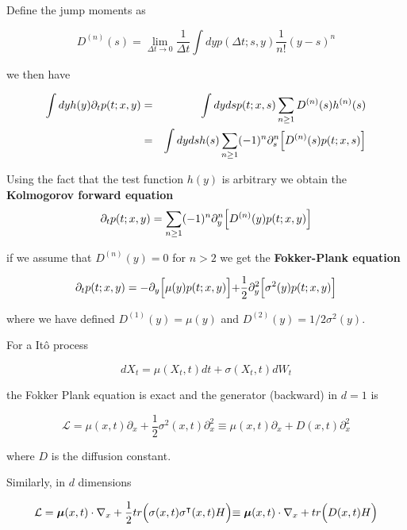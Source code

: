 \documentclass[11pt,a4paper]{article}
\begin{document}
Define the jump moments as 

\begin{equation}
    D^{(n)}(s) = \lim_{\Delta t \to 0}\frac{1}{\Delta t}\int dyp(\Delta t;s,y)\frac{1}{n!}(y-s)^n    
\end{equation}

we then have

\begin{eqnarray*}
    \int dyh(y)\partial_t p(t;x,y) &=&  \int dyds p(t;x,s)\sum_{n\geq 1}D^{(n)}(s)h^{(n)}(s)   \\
    &=& \int dyds h(s)\sum_{n\geq 1}(-1)^n\partial^{n}_{s}\Bigl[D^{(n)}(s)p(t;x,s)\Bigl]
\end{eqnarray*}


Using the fact that the test function $h(y)$ is arbitrary we obtain the \textbf{Kolmogorov forward equation}
\begin{equation}
\partial_t p(t;x,y) =  \sum_{n\geq 1}(-1)^n\partial^{n}_{y}   \Bigl[D^{(n)}(y)p(t;x,y)\Bigl]
\end{equation}

if we assume that $D^{(n)}(y)=0$ for $n>2$ we get the \textbf{Fokker-Plank equation}

\begin{equation}
    \partial_t p(t;x,y) =  -\partial_y\Bigl[\mu(y)p(t;x,y)\Bigl]  + \frac{1}{2}\partial^2_y \Bigl[\sigma^2(y)p(t;x,y)\Bigl]
\end{equation}

where we have defined $D^{(1)}(y) = \mu(y)$ and $D^{(2)}(y) = 1/2 \sigma^2(y)$.

For a It\^{o} process 

\begin{equation*}
    dX_t = \mu(X_t,t) dt + \sigma(X_t,t) dW_t
\end{equation*}


the Fokker Plank equation is exact and the generator (backward) in $d=1$ is

\begin{equation}
    \mathcal{L} = \mu(x,t)\partial_x + \frac{1}{2}\sigma^2(x,t)\partial^2_x \equiv \mu(x,t)\partial_x + D(x,t)\partial^2_x
\end{equation}

where $D$ is the diffusion constant.

Similarly, in $d$ dimensions

\begin{equation}
    \mathcal{L} = \boldsymbol{\mu}(x,t)\cdot \nabla_x + \frac{1}{2}tr\Bigl(\sigma(x,t) \sigma^{\intercal}(x,t)H\Bigl) \equiv \boldsymbol{\mu}(x,t)\cdot \nabla_x + tr\Bigl(D(x,t)H\Bigl) 
\end{equation}
\end{document}
